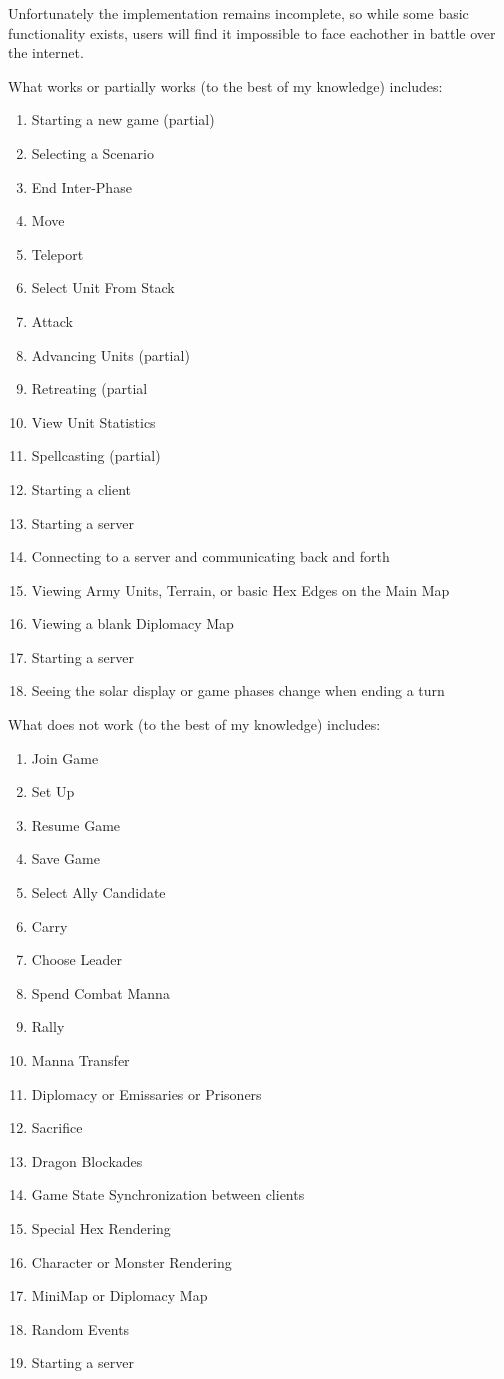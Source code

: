 \documentclass[12pt,a4paper]{article}
\begin{document}
Unfortunately the implementation remains incomplete, so while some basic
functionality exists, users will find it impossible to face eachother in battle
over the internet.

What works or partially works (to the best of my knowledge) includes:

\begin{enumerate}
\item{Starting a new game (partial)}
\item{Selecting a Scenario}
\item{End Inter-Phase}
\item{Move}
\item{Teleport}
\item{Select Unit From Stack}
\item{Attack}
\item{Advancing Units (partial)}
\item{Retreating (partial}
\item{View Unit Statistics}
\item{Spellcasting (partial)}
\item{Starting a client}
\item{Starting a server}
\item{Connecting to a server and communicating back and forth}
\item{Viewing Army Units, Terrain, or basic Hex Edges on the Main Map}
\item{Viewing a blank Diplomacy Map}
\item{Starting a server}
\item{Seeing the solar display or game phases change when ending a turn}
\end{enumerate}

What does not work (to the best of my knowledge) includes:

\begin{enumerate}
\item{Join Game}
\item{Set Up}
\item{Resume Game}
\item{Save Game}
\item{Select Ally Candidate}
\item{Carry}
\item{Choose Leader}
\item{Spend Combat Manna}
\item{Rally}
\item{Manna Transfer}
\item{Diplomacy or Emissaries or Prisoners}
\item{Sacrifice}
\item{Dragon Blockades}
\item{Game State Synchronization between clients}
\item{Special Hex Rendering}
\item{Character or Monster Rendering}
\item{MiniMap or Diplomacy Map}
\item{Random Events}
\item{Starting a server}
\end{enumerate}
\end{document}
